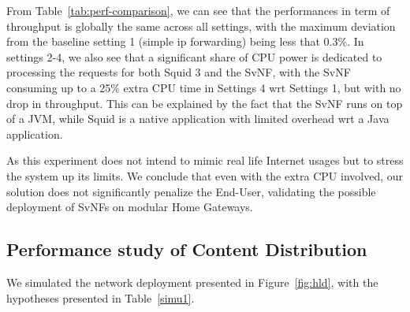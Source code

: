 From Table~\ref{tab:perf-comparison}, we can see that the performances in term of throughput is globally the same across all settings, with the maximum deviation from the baseline setting 1 (simple ip forwarding) being less that 0.3\%.
In settings 2-4, we also see that a significant share of CPU power is dedicated to processing the requests for both Squid 3 and the SvNF, with the SvNF consuming up to a 25\% extra CPU time in Settings 4 wrt Settings 1, but with no drop in throughput. This can be explained by the fact that the SvNF runs on top of a JVM, while Squid is a native application with limited overhead wrt a Java application.

As this experiment does not intend to mimic real life Internet usages but to stress the system up its limits.
We conclude that even with the extra CPU involved, our solution does not significantly penalize the End-User, validating the possible deployment of SvNFs on modular Home Gateways.

\subsection{Performance study of Content Distribution} \label{videodelivery}
\begin{table}
	\caption{Hypothesis used for simulation\label{simu1}}
\end{table}
We simulated the network deployment presented in Figure~\ref{fig:hld}, with the hypotheses presented in Table~\ref{simu1}.

